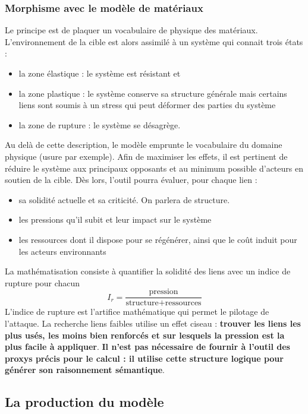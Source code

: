\documentclass[11pt]{article}
\begin{document}
			\subsubsection*{Morphisme avec le modèle de matériaux}
				Le principe est de plaquer un vocabulaire de physique des matériaux. L'environnement de la cible est alors assimilé à un système qui connait trois états : 
				\begin{itemize}
					\item la zone élastique : le système est résistant et 
					\item la zone plastique : le système conserve sa structure générale mais certains liens sont soumis à un stress qui peut déformer des parties du système
					\item la zone de rupture : le système se désagrège. 
				\end{itemize}
			
				Au delà de cette description, le modèle emprunte le vocabulaire du domaine physique (usure par exemple). Afin de maximiser les effets, il est pertinent de réduire le système aux principaux opposants et au minimum possible d'acteurs en soutien de la cible. Dès lors, l'outil pourra évaluer, pour chaque lien : 
				\begin{itemize}
					\item sa solidité actuelle et sa criticité. On parlera de structure. 
					\item les pressions qu'il subit et leur impact sur le système
					\item les ressources dont il dispose pour se régénérer, ainsi que le coût induit pour les acteurs environnants
				\end{itemize}
				
				\vspace{0.5cm}
				La mathématisation consiste à quantifier la solidité des liens avec un indice de rupture pour chacun $$\displaystyle{I_r = \frac{\text{pression}}{\text{structure} + \text{ressources}}}$$
				L'indice de rupture est l'artifice mathématique qui permet le pilotage de l'attaque. La recherche liens faibles utilise un effet ciseau : \textbf{trouver les liens les plus usés, les moins bien renforcés et sur lesquels la pression est la plus facile à appliquer}. \textbf{Il n'est pas nécessaire de fournir à l'outil des proxys précis pour le calcul : il utilise cette structure logique pour générer son raisonnement sémantique}. 

		\subsection{La production du modèle}
		
\end{document}

